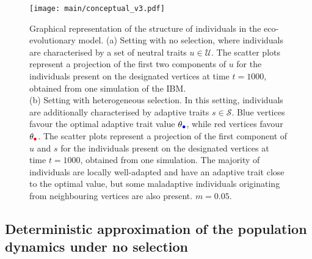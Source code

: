   \begin{figure}[t]
	\centering
	\texttt{[image: main/conceptual\_v3.pdf]}
	\caption{\small Graphical representation of the structure of individuals in the eco-evolutionary model. (a) Setting with no selection, where individuals are characterised by a set of neutral traits $u \in \mathcal{U}$. The scatter plots represent a projection of the first two components of $u$ for the individuals present on the designated vertices at time $t=1000$, obtained from one simulation of the IBM.\\
	(b) Setting with heterogeneous selection. In this setting, individuals are additionally characterised by adaptive traits $s \in \mathcal{S}$. Blue vertices favour the optimal adaptive trait value $\theta_{\bcirc}$, while red vertices favour $\theta_{\rcirc}$. The scatter plots represent a projection of the first component of $u$ and $s$ for the individuals present on the designated vertices at time $t = 1000$, obtained from one simulation. The majority of individuals are locally well-adapted and have an adaptive trait close to the optimal value, but some maladaptive individuals originating from neighbouring vertices are also present. $m = 0.05$.}
	\label{fig:conceptual}
  \end{figure}
  
  \subsection{Deterministic approximation of the population dynamics under no selection}\label{sec:212}
  
